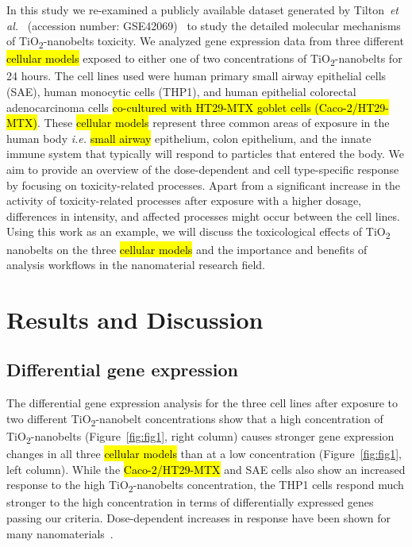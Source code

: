 \documentclass[ijms,article,submit,moreauthors,pdftex]{Definitions/mdpi}
\begin{document}
In this study we re-examined a publicly available dataset generated by Tilton~\textit{et al.}~\cite{Tilton2013} (accession number: GSE42069)~\cite{Edgar2002} to study the detailed molecular mechanisms of TiO\textsubscript{2}-nanobelts toxicity. We analyzed gene expression data from three different \hl{cellular models} exposed to either one of two concentrations of TiO\textsubscript{2}-nanobelts for 24 hours. The cell lines used were human primary small airway epithelial cells (SAE), human monocytic cells (THP1), and human epithelial colorectal adenocarcinoma cells \hl{co-cultured with HT29-MTX goblet cells (Caco-2/HT29-MTX)}. These \hl{cellular models} represent three common areas of exposure in the human body \textit{i.e.} \hl{small airway} epithelium, colon epithelium, and the innate immune system that typically will respond to particles that entered the body. We aim to provide an overview of the dose-dependent and cell type-specific response by focusing on toxicity-related processes. Apart from a significant increase in the activity of toxicity-related processes after exposure with a higher dosage, differences in intensity, and affected processes might occur between the cell lines. Using this work as an example, we will discuss the toxicological effects of TiO\textsubscript{2} nanobelts on the three \hl{cellular models} and the importance and benefits of analysis workflows in the nanomaterial research field.
 
\section{Results and Discussion}

\subsection*{Differential gene expression}
The differential gene expression analysis for the three cell lines after exposure to two different TiO\textsubscript{2}-nanobelt concentrations show that a high concentration of TiO\textsubscript{2}-nanobelts (Figure~\ref{fig:fig1}, right column) causes stronger gene expression changes in all three \hl{cellular models} than at a low concentration (Figure~\ref{fig:fig1}, left column). While the \hl{Caco-2/HT29-MTX} and SAE cells also show an increased response to the high TiO\textsubscript{2}-nanobelts concentration, the THP1 cells respond much stronger to the high concentration in terms of differentially expressed genes passing our criteria. Dose-dependent increases in response have been shown for many nanomaterials~\cite{Iavicoli2018,Ding2005}.
\end{document}

